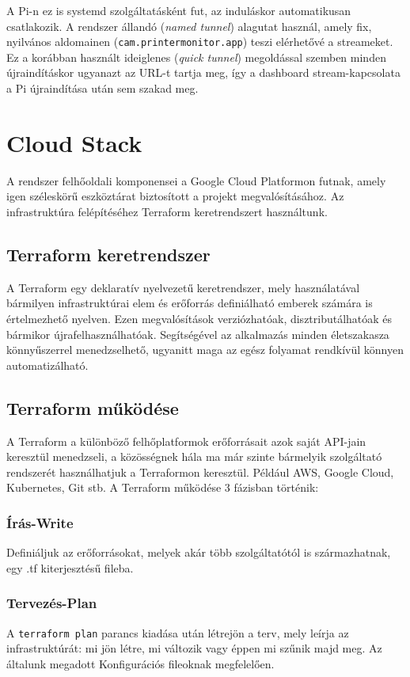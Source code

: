        A Pi-n ez is systemd szolgáltatásként fut, az induláskor automatikusan csatlakozik.
        A rendszer állandó (\textit{named tunnel}) alagutat használ, amely fix, nyilvános aldomainen (\texttt{cam.printermonitor.app}) teszi elérhetővé a streameket.
        Ez a korábban használt ideiglenes (\textit{quick tunnel}) megoldással szemben minden újraindításkor ugyanazt az URL-t tartja meg,
        így a dashboard stream-kapcsolata a Pi újraindítása után sem szakad meg.

    \section{Cloud Stack}
    A rendszer felhőoldali komponensei a Google Cloud Platformon futnak, amely igen széleskörű eszköztárat biztosított a projekt megvalósításához.
    Az infrastruktúra felépítéséhez Terraform keretrendszert használtunk.

        \subsection{Terraform keretrendszer}
        A Terraform egy deklaratív nyelvezetű keretrendszer, mely használatával bármilyen infrastruktúrai elem és erőforrás definiálható
        emberek számára is értelmezhető nyelven\cite{terraform}. Ezen megvalósítások verziózhatóak, disztributálhatóak és bármikor újrafelhasználhatóak.
        Segítségével az alkalmazás minden életszakasza könnyűszerrel menedzselhető, ugyanitt maga az egész folyamat rendkívül könnyen automatizálható.
        
        \subsection{Terraform működése}
        A Terraform a különböző felhőplatformok erőforrásait azok saját API-jain keresztül menedzseli, a közösségnek hála ma már szinte bármelyik
        szolgáltató rendszerét használhatjuk a Terraformon keresztül. Például AWS, Google Cloud, Kubernetes, Git stb. A Terraform működése 3 fázisban történik:

            \subsubsection{Írás-Write}
            Definiáljuk az erőforrásokat, melyek akár több szolgáltatótól is származhatnak, egy .tf kiterjesztésű fileba.
            
            \subsubsection{Tervezés-Plan}
            A \texttt{terraform plan} parancs kiadása után létrejön a terv, mely leírja az infrastruktúrát: mi jön létre, mi változik vagy éppen mi szűnik majd meg.
            Az általunk megadott Konfigurációs fileoknak megfelelően.


